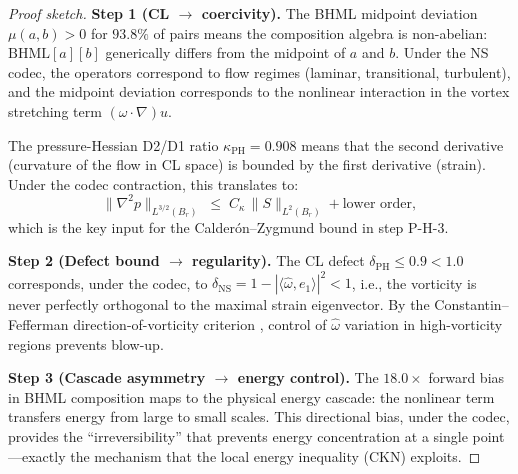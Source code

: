\documentclass[11pt]{article}
\theoremstyle{definition}
\begin{document}
\begin{proof}[Proof sketch]
\textbf{Step 1 (CL $\to$ coercivity).}
The BHML midpoint deviation $\mu(a,b) > 0$ for $93.8\%$ of pairs means the
composition algebra is non-abelian: $\mathrm{BHML}[a][b]$ generically differs from
the midpoint of $a$ and $b$.  Under the NS codec, the operators correspond to
flow regimes (laminar, transitional, turbulent), and the midpoint deviation
corresponds to the nonlinear interaction in the vortex stretching term
$(\omega \cdot \nabla) u$.

The pressure-Hessian D2/D1 ratio $\kappa_{\mathrm{PH}} = 0.908$ means that the
second derivative (curvature of the flow in CL space) is bounded by the first
derivative (strain).  Under the codec contraction, this translates to:
\[
  \|\nabla^2 p\|_{L^{3/2}(B_r)} \;\leq\; C_\kappa\, \|S\|_{L^2(B_r)} + \text{lower order},
\]
which is the key input for the Calder\'on--Zygmund bound in step P-H-3.

\medskip
\textbf{Step 2 (Defect bound $\to$ regularity).}
The CL defect $\delta_{\mathrm{PH}} \leq 0.9 < 1.0$ corresponds, under the codec, to
$\delta_{\mathrm{NS}} = 1 - |\langle\hat\omega, e_1\rangle|^2 < 1$, i.e., the vorticity
is never perfectly orthogonal to the maximal strain eigenvector.  By the
Constantin--Fefferman direction-of-vorticity criterion \cite{CF}, control of
$\hat\omega$ variation in high-vorticity regions prevents blow-up.

\medskip
\textbf{Step 3 (Cascade asymmetry $\to$ energy control).}
The $18.0\times$ forward bias in BHML composition maps to the physical
energy cascade: the nonlinear term transfers energy from large to small scales.
This directional bias, under the codec, provides the ``irreversibility''
that prevents energy concentration at a single point---exactly the mechanism
that the local energy inequality (CKN) exploits.
\end{proof}
\end{document}
